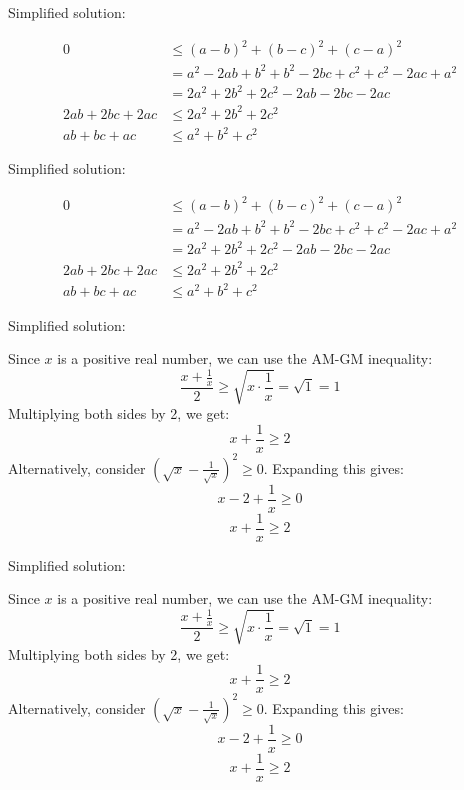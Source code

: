 \documentclass{article}
\begin{document}
Simplified solution:
\begin{tcolorbox}[colback=blue!10, width=\linewidth]
\begin{align*} 0 &\le (a-b)^2 + (b-c)^2 + (c-a)^2 \\ &= a^2 - 2ab + b^2 + b^2 - 2bc + c^2 + c^2 - 2ac + a^2 \\ &= 2a^2 + 2b^2 + 2c^2 - 2ab - 2bc - 2ac \\ 2ab + 2bc + 2ac &\le 2a^2 + 2b^2 + 2c^2 \\ ab + bc + ac &\le a^2 + b^2 + c^2\end{align*}
\end{tcolorbox}



Simplified solution:
\begin{tcolorbox}[colback=blue!10, width=\linewidth]
\begin{align*} 0 &\le (a-b)^2 + (b-c)^2 + (c-a)^2 \\ &= a^2 - 2ab + b^2 + b^2 - 2bc + c^2 + c^2 - 2ac + a^2 \\ &= 2a^2 + 2b^2 + 2c^2 - 2ab - 2bc - 2ac \\ 2ab + 2bc + 2ac &\le 2a^2 + 2b^2 + 2c^2 \\ ab + bc + ac &\le a^2 + b^2 + c^2\end{align*}
\end{tcolorbox}



Simplified solution:
\begin{tcolorbox}[colback=blue!10, width=\linewidth]
Since $x$ is a positive real number, we can use the AM-GM inequality:
\[ \frac{x + \frac{1}{x}}{2} \ge \sqrt{x \cdot \frac{1}{x}} = \sqrt{1} = 1 \]
Multiplying both sides by 2, we get:
\[ x + \frac{1}{x} \ge 2 \]
Alternatively, consider $( \sqrt{x} - \frac{1}{\sqrt{x}})^2 \ge 0$. Expanding this gives:
\[ x - 2 + \frac{1}{x} \ge 0 \]
\[ x + \frac{1}{x} \ge 2 \]
\end{tcolorbox}



Simplified solution:
\begin{tcolorbox}[colback=blue!10, width=\linewidth]
Since $x$ is a positive real number, we can use the AM-GM inequality:
\[ \frac{x + \frac{1}{x}}{2} \ge \sqrt{x \cdot \frac{1}{x}} = \sqrt{1} = 1 \]
Multiplying both sides by 2, we get:
\[ x + \frac{1}{x} \ge 2 \]
Alternatively, consider $( \sqrt{x} - \frac{1}{\sqrt{x}})^2 \ge 0$. Expanding this gives:
\[ x - 2 + \frac{1}{x} \ge 0 \]
\[ x + \frac{1}{x} \ge 2 \]
\end{tcolorbox}
\end{document}

